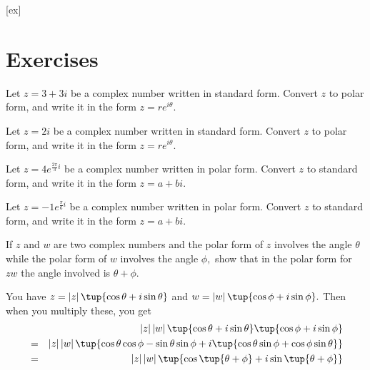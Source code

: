 [ex]
\section*{Exercises}

\begin{enumialphparenastyle}

\begin{ex} Let $z = 3 + 3i$ be a complex number written in standard form. Convert $z$ to polar form, and write it in the form $z = re^{i\theta}$.
\end{ex}

\begin{ex} Let $z = 2i$ be a complex number written in standard form. Convert $z$ to polar form, and write it in the form $z = re^{i\theta}$.
\end{ex}

\begin{ex} Let $z = 4e^{\frac{2\pi}{3}i}$ be a complex number written in polar form. Convert $z$ to standard form, and write it in the form $z = a+bi$.
\end{ex}

\begin{ex} Let $z = -1e^{\frac{\pi}{6}i}$ be a complex number written in polar form. Convert $z$ to standard form, and write it in the form $z = a+bi$.
\end{ex}

\begin{ex} If $z$ and $w$ are two complex numbers and the polar form of $z$
involves the angle $\theta $ while the polar form of $w$ involves the angle 
$\phi ,$ show that in the polar form for $zw$ the angle involved is $\theta
+\phi .$ 
\begin{sol}
 You have $z=\left\vert z\right\vert \tup{\cos
\theta +i\sin \theta } $ and $w=\left\vert w\right\vert \tup{\cos
\phi +i\sin \phi } .$ Then when you multiply these, you get
\begin{eqnarray*}
&&\left\vert z\right\vert \left\vert w\right\vert \tup{\cos \theta +i\sin
\theta } \tup{\cos \phi +i\sin \phi } \\
&=&\left\vert z\right\vert \left\vert w\right\vert \tup{\cos \theta \cos
\phi -\sin \theta \sin \phi +i\tup{\cos \theta \sin \phi +\cos \phi \sin
\theta } } \\
&=&\left\vert z\right\vert \left\vert w\right\vert \tup{\cos \tup{\theta
+\phi } +i\sin \tup{\theta +\phi } }
\end{eqnarray*}
\end{sol}
\end{ex}

\end{enumialphparenastyle}